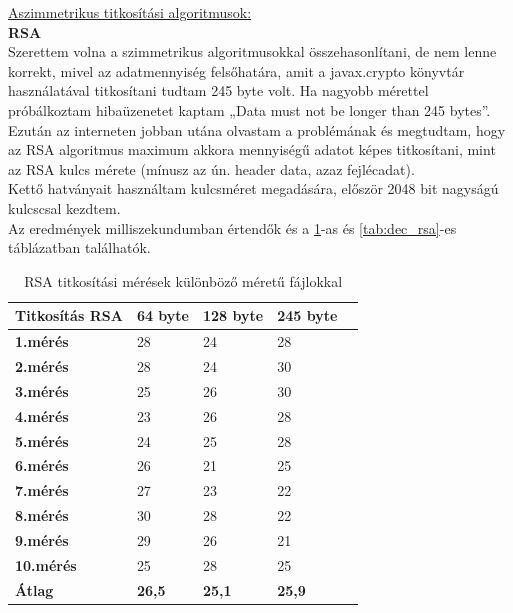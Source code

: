 \vspace{25pt} \noindent \underline{Aszimmetrikus titkosítási algoritmusok:}
\vspace{15pt} \\ \textbf{RSA}
\vspace{5pt} \\ Szerettem volna a szimmetrikus algoritmusokkal összehasonlítani, de nem lenne korrekt, mivel az adatmennyiség felsőhatára, amit a javax.crypto könyvtár használatával titkosítani tudtam 245 byte volt. Ha nagyobb mérettel próbálkoztam hibaüzenetet kaptam „Data must not be longer than 245 bytes”.
\vspace{5pt} \\Ezután az interneten jobban utána olvastam a problémának és megtudtam, hogy az RSA algoritmus maximum akkora mennyiségű adatot képes titkosítani, mint az RSA kulcs mérete (mínusz az ún. header data, azaz fejlécadat). 
\vspace{5pt} \\Kettő hatványait használtam kulcsméret megadására, először 2048 bit nagy\-sá\-gú kulcs\-csal kezdtem.
\\Az eredmények milliszekundumban értendők és a \ref{tab:enc_rsa}-as és \ref{tab:dec_rsa}-es táblázatban találhatók.

\begin{table}[H]
	\centering
	\caption{RSA titkosítási mérések különböző méretű fájlokkal}
	\label{tab:enc_rsa}
	\medskip
	\begin{tabular}{|p{2.4cm}|p{2cm}|p{2cm}|p{2cm}|p{2cm}|}
		\hline
		\textbf{Titkosítás} \newline \textbf{RSA} & \textbf{64 byte} & \textbf{128 byte} & \textbf{245 byte}\\
		\hline
		\textbf{1.mérés} & 28 & 24 & 28\\
		\hline
		\textbf{2.mérés} & 28 & 24 & 30\\
		\hline
		\textbf{3.mérés} & 25 & 26 & 30\\
		\hline
		\textbf{4.mérés} & 23 & 26 & 28\\
		\hline
		\textbf{5.mérés} & 24 & 25 & 28\\
		\hline
		\textbf{6.mérés} & 26 & 21 & 25\\
		\hline
		\textbf{7.mérés} & 27 & 23 & 22\\
		\hline
		\textbf{8.mérés} & 30 & 28 & 22\\
		\hline
		\textbf{9.mérés} & 29 & 26 & 21\\
		\hline
		\textbf{10.mérés} & 25 & 28 & 25\\
		\hline
		\hline
		\textbf{Átlag} & \textbf{26,5} & \textbf{25,1} & \textbf{25,9}\\
		\hline
	\end{tabular}
\end{table}

